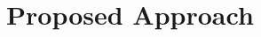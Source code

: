 \documentclass{mprop}
\theoremstyle{definition}
\begin{document}







\section{Proposed Approach}
\end{document}
